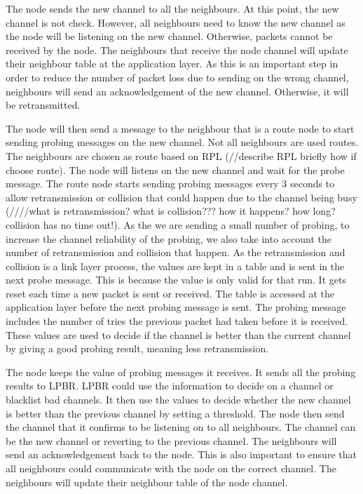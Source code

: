 The node sends the new channel to all the neighbours. At this point, the new channel is not check. However, all neighbours need to know the new channel as the node will be listening on the new channel. Otherwise, packets cannot be received by the node. The neighbours that receive the node channel will update their neighbour table at the application layer. As this is an important step in order to reduce the number of packet loss due to sending on the wrong channel, neighbours will send an acknowledgement of the new channel. Otherwise, it will be retransmitted. 

The node will then send a message to the neighbour that is a route node to start sending probing messages on the new channel. Not all neighbours are used routes. The neighbours are chosen as route based on RPL (//describe RPL briefly how if choose route). The node will listens on the new channel and wait for the probe message. The route node starts sending probing messages every 3 seconds to allow retransmission or collision that could happen due to the channel being busy (////what is retransmission? what is collision??? how it happens? how long? collision has no time out!). As the we are sending a small number of probing, to increase the channel reliability of the probing, we also take into account the number of retransmission and collision that happen. As the retransmission and collision is a link layer process, the values are kept in a table and is sent in the next probe message. This is because the value is only valid for that run. It gets reset each time a new packet is sent or received. The table is accessed at the application layer before the next probing message is sent. The probing message includes the number of tries the previous packet had taken before it is received. These values are used to decide if the channel is better than the current channel by giving a good probing result, meaning less retransmission.

The node keeps the value of probing messages it receives. It sends all the probing results to LPBR. LPBR could use the information to decide on a channel or blacklist bad channels. It then use the values to decide whether the new channel is better than the previous channel by setting a threshold. The node then send the channel that it confirms to be listening on to all neighbours. The channel can be the new channel or reverting to the previous channel. The neighbours will send an acknowledgement back to the node. This is also important to ensure that all neighbours could communicate with the node on the correct channel. The neighbours will update their neighbour table of the node channel. 


